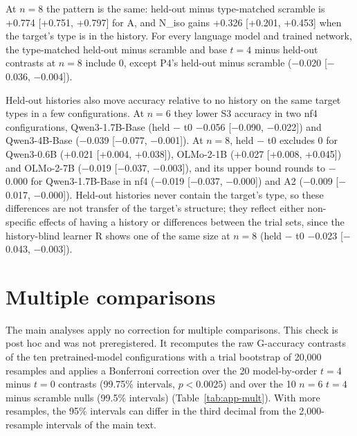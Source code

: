 \documentclass[11pt]{article}
\begin{document}
At $n = 8$ the pattern is the same: held-out minus type-matched scramble is +0.774 [+0.751, +0.797] for A, and N\_iso gains +0.326 [+0.201, +0.453] when the target's type is in the history. For every language model and trained network, the type-matched held-out minus scramble and base $t = 4$ minus held-out contrasts at $n = 8$ include 0, except P4's held-out minus scramble ($-$0.020 [$-$0.036, $-$0.004]).

Held-out histories also move accuracy relative to no history on the same target types in a few configurations. At $n = 6$ they lower S3 accuracy in two nf4 configurations, Qwen3-1.7B-Base (held $-$ t0 $-$0.056 [$-$0.090, $-$0.022]) and Qwen3-4B-Base ($-$0.039 [$-$0.077, $-$0.001]). At $n = 8$, held $-$ t0 excludes 0 for Qwen3-0.6B (+0.021 [+0.004, +0.038]), OLMo-2-1B (+0.027 [+0.008, +0.045]) and OLMo-2-7B ($-$0.019 [$-$0.037, $-$0.003]), and its upper bound rounds to $-$0.000 for Qwen3-1.7B-Base in nf4 ($-$0.019 [$-$0.037, $-$0.000]) and A2 ($-$0.009 [$-$0.017, $-$0.000]). Held-out histories never contain the target's type, so these differences are not transfer of the target's structure; they reflect either non-specific effects of having a history or differences between the trial sets, since the history-blind learner R shows one of the same size at $n = 8$ (held $-$ t0 $-$0.023 [$-$0.043, $-$0.003]).

\section{Multiple comparisons}\label{app:mult}

The main analyses apply no correction for multiple comparisons. This check is post hoc and was not preregistered. It recomputes the raw G-accuracy contrasts of the ten pretrained-model configurations with a trial bootstrap of 20,000 resamples and applies a Bonferroni correction over the 20 model-by-order $t = 4$ minus $t = 0$ contrasts (99.75\% intervals, $p < 0.0025$) and over the 10 $n = 6$ $t = 4$ minus scramble nulls (99.5\% intervals) (Table~\ref{tab:app-mult}). With more resamples, the 95\% intervals can differ in the third decimal from the 2,000-resample intervals of the main text.
\end{document}
